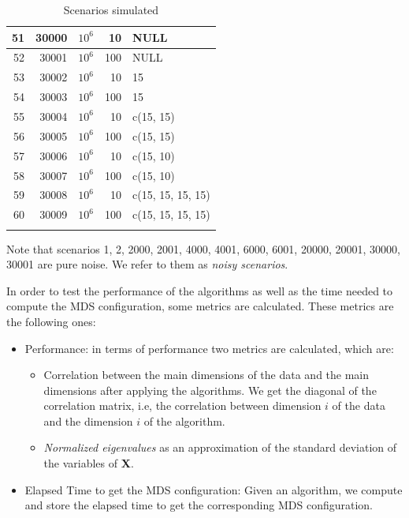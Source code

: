 \documentclass[11pt]{report}
\begin{document}
\begin{longtable}{|r|r|r|r|l|}
\hline
\hline
51 & 30000 & $10^6$ & 10 & NULL \\ 
\hline
52 & 30001 & $10^6$ & 100 & NULL \\ 
\hline
53 & 30002 & $10^6$ & 10 & 15 \\ 
\hline
54 & 30003 & $10^6$ & 100 & 15 \\ 
\hline
55 & 30004 & $10^6$ & 10 & c(15, 15) \\ 
\hline
56 & 30005 & $10^6$ & 100 & c(15, 15) \\ 
\hline
57 & 30006 & $10^6$ & 10 & c(15, 10) \\ 
\hline
58 & 30007 & $10^6$ & 100 & c(15, 10) \\ 
\hline
59 & 30008 & $10^6$ & 10 & c(15, 15, 15, 15) \\ 
\hline
60 & 30009 & $10^6$ & 100 & c(15, 15, 15, 15) \\ 
\hline
\caption{Scenarios simulated} 
\label{scenarios_sim}
\end{longtable}


\indent Note that scenarios 1, 2, 2000, 2001, 4000, 4001, 6000, 6001, 20000,
20001, 30000, 30001 are pure noise. We refer to them as \textit{noisy 
scenarios}.

\indent In order to test the performance of the algorithms as well as the time
needed to compute the MDS configuration, some metrics are calculated. These
metrics are the following ones:

\begin{itemize}
\item Performance: in terms of performance two metrics are calculated, which 
are:
\begin{itemize}


\item Correlation between the main dimensions of the data and the
main dimensions after applying the algorithms. We get the diagonal of the 
correlation matrix, i.e, the correlation between dimension $i$ of the data 
and the dimension $i$ of the algorithm. 

\item \textit{Normalized eigenvalues} as an approximation of the standard 
deviation of the variables of \textbf{X}.
\end{itemize}

\item Elapsed Time to get the MDS configuration: Given an algorithm, we compute 
and store the elapsed time to get the corresponding MDS configuration.

\end{itemize}
\end{document}
